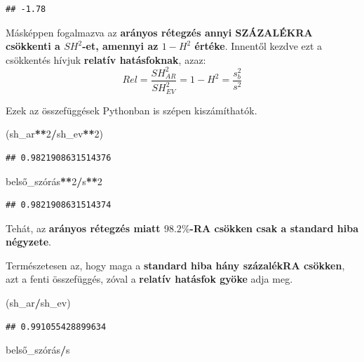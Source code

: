 \documentclass[
]{book}
\newenvironment{Shaded}{\begin{snugshade}}{\end{snugshade}}
\newcommand{\DecValTok}[1]{\textcolor[rgb]{0.00,0.00,0.81}{#1}}
\newcommand{\NormalTok}[1]{#1}
\newcommand{\OperatorTok}[1]{\textcolor[rgb]{0.81,0.36,0.00}{\textbf{#1}}}
\begin{document}
\begin{verbatim}
## -1.78
\end{verbatim}

Másképpen fogalmazva az \textbf{arányos rétegzés annyi SZÁZALÉKRA csökkenti a \(SH^2\)-et, amennyi az \(1-H^2\) értéke}. Innentől kezdve ezt a csökkentés hívjuk \textbf{relatív hatásfoknak}, azaz: \[Rel=\frac{SH_{AR}^2}{SH_{EV}^2}=1-H^2=\frac{s_b^2}{s^2}\]

Ezek az összefüggések Pythonban is szépen kiszámíthatók.

\begin{Shaded}
\begin{Highlighting}[]
\NormalTok{(sh\_ar}\OperatorTok{**}\DecValTok{2}\OperatorTok{/}\NormalTok{sh\_ev}\OperatorTok{**}\DecValTok{2}\NormalTok{)}
\end{Highlighting}
\end{Shaded}

\begin{verbatim}
## 0.9821908631514376
\end{verbatim}

\begin{Shaded}
\begin{Highlighting}[]
\NormalTok{belső\_szórás}\OperatorTok{**}\DecValTok{2}\OperatorTok{/}\NormalTok{s}\OperatorTok{**}\DecValTok{2}
\end{Highlighting}
\end{Shaded}

\begin{verbatim}
## 0.9821908631514374
\end{verbatim}

Tehát, az \textbf{arányos rétegzés miatt \(98.2\%\)-RA csökken csak a standard hiba négyzete}.

Természetesen az, hogy maga a \textbf{standard hiba hány százalékRA csökken}, azt a fenti összefüggés, zóval a \textbf{relatív hatásfok gyöke} adja meg.

\begin{Shaded}
\begin{Highlighting}[]
\NormalTok{(sh\_ar}\OperatorTok{/}\NormalTok{sh\_ev)}
\end{Highlighting}
\end{Shaded}

\begin{verbatim}
## 0.991055428899634
\end{verbatim}

\begin{Shaded}
\begin{Highlighting}[]
\NormalTok{belső\_szórás}\OperatorTok{/}\NormalTok{s}
\end{Highlighting}
\end{Shaded}
\end{document}
